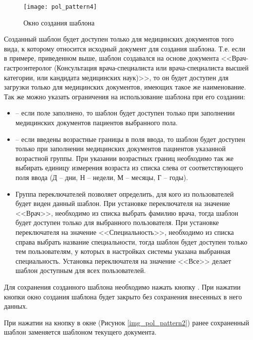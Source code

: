 \begin{figure}[h!]\centering
   \texttt{[image: pol\_pattern4]}
   \caption{Окно создания шаблона}
   \label{img_pol_pattern4}
 \end{figure}
 
Созданный шаблон будет доступен только для медицинских документов того вида, к которому относится исходный документ для создания шаблона. Т.е. если в примере, приведенном выше, шаблон создавался на основе документа <<Врач-гастроэнтеролог (Консультация врача-специалиста или врача-специалиста высшей категории, или кандидата медицинских наук)>>, то он будет доступен для загрузки только для медицинских документов, имеющих такое же наименование. Так же можно указать ограничения на использование шаблона при его создании:
\begin{itemize}
 \item {} – если поле заполнено, то шаблон будет доступен только при заполнении медицинских документов пациентов выбранного пола.
 \item {} – если введены возрастные границы в поля ввода, то шаблон будет доступен только при заполнении медицинских документов пациентов указанной возрастной группы. При указании возрастных границ необходимо так же выбирать единицу измерения возраста из списка слева от соответствующего поля ввода (Д – дни, Н – недели, М – месяцы, Г – годы).
 \item Группа переключателей  позволяет определить, для кого из пользователей будет виден данный шаблон. При установке переключателя на значение <<Врач>>, необходимо из списка выбрать фамилию врача, тогда шаблон будет доступен только для выбранного пользователя. При установке переключателя на значение <<Специальность>>, необходимо из списка справа выбрать название специальности, тогда шаблон будет доступен только тем пользователям, у которых в настройках системы указана выбранная специальность. Установка переключателя на значение <<Все>> делает шаблон доступным для всех пользователей.
\end{itemize}

Для сохранения созданного шаблона необходимо нажать кнопку . При нажатии кнопки  окно создания шаблона будет закрыто без сохранения внесенных в него данных.

При нажатии на кнопку  в окне  (Рисунок \ref{img_pol_pattern2}) ранее сохраненный шаблон заменяется шаблоном текущего документа.

